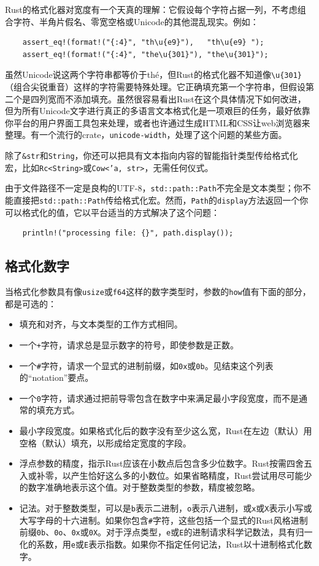 Rust的格式化器对宽度有一个天真的理解：它假设每个字符占据一列，不考虑组合字符、半角片假名、零宽空格或Unicode的其他混乱现实。例如：
\begin{verbatim}
    assert_eq!(format!("{:4}", "th\u{e9}"),   "th\u{e9} ");
    assert_eq!(format!("{:4}", "the\u{301}"), "the\u{301}");
\end{verbatim}

虽然Unicode说这两个字符串都等价于thé，但Rust的格式化器不知道像\texttt{\textbackslash u\{301\}}（组合尖锐重音）这样的字符需要特殊处理。它正确填充第一个字符串，但假设第二个是四列宽而不添加填充。虽然很容易看出Rust在这个具体情况下如何改进，但为所有Unicode文字进行真正的多语言文本格式化是一项艰巨的任务，最好依靠你平台的用户界面工具包来处理，或者也许通过生成HTML和CSS让web浏览器来整理。有一个流行的crate，\texttt{unicode-width}，处理了这个问题的某些方面。

除了\texttt{\&str}和\texttt{String}，你还可以把具有文本指向内容的智能指针类型传给格式化宏，比如\texttt{Rc<String>}或\texttt{Cow<'a, str>}，无需任何仪式。

由于文件路径不一定是良构的UTF-8，\texttt{std::path::Path}不完全是文本类型；你不能直接把\texttt{std::path::Path}传给格式化宏。然而，\texttt{Path}的\texttt{display}方法返回一个你可以格式化的值，它以平台适当的方式解决了这个问题：
\begin{verbatim}
    println!("processing file: {}", path.display());
\end{verbatim}

\subsection{格式化数字}

当格式化参数具有像\texttt{usize}或\texttt{f64}这样的数字类型时，参数的\texttt{how}值有下面的部分，都是可选的：
\begin{itemize}
    \item 填充和对齐，与文本类型的工作方式相同。
    \item 一个\texttt{+}字符，请求总是显示数字的符号，即使参数是正数。
    \item 一个\texttt{\#}字符，请求一个显式的进制前缀，如\texttt{0x}或\texttt{0b}。见结束这个列表的“notation”要点。
    \item 一个\texttt{0}字符，请求通过把前导零包含在数字中来满足最小字段宽度，而不是通常的填充方式。
    \item 最小字段宽度。如果格式化后的数字没有至少这么宽，Rust在左边（默认）用空格（默认）填充，以形成给定宽度的字段。
    \item 浮点参数的精度，指示Rust应该在小数点后包含多少位数字。Rust按需四舍五入或补零，以产生恰好这么多的小数位。如果省略精度，Rust尝试用尽可能少的数字准确地表示这个值。对于整数类型的参数，精度被忽略。
    \item 记法。对于整数类型，可以是\texttt{b}表示二进制，\texttt{o}表示八进制，或\texttt{x}或\texttt{X}表示小写或大写字母的十六进制。如果你包含\texttt{\#}字符，这些包括一个显式的Rust风格进制前缀\texttt{0b}、\texttt{0o}、\texttt{0x}或\texttt{0X}。对于浮点类型，\texttt{e}或\texttt{E}的进制请求科学记数法，具有归一化的系数，用\texttt{e}或\texttt{E}表示指数。如果你不指定任何记法，Rust以十进制格式化数字。
\end{itemize}


